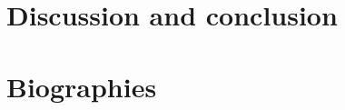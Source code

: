 \documentclass{IEEEcsmag}
\begin{document}



\section{\textbf{Discussion and conclusion}}
\label{sec:discussion}


\section{\textbf{Biographies}}
\label{sec:biographies}


%


%

%


%

\small

\end{document}

